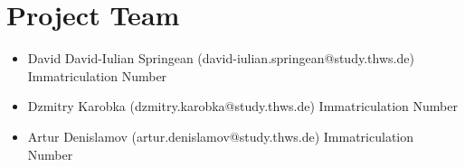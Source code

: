 \section{Project Team}

\begin{itemize}
    \item David David-Iulian Springean (david-iulian.springean@study.thws.de) Immatriculation Number
    \item Dzmitry Karobka (dzmitry.karobka@study.thws.de) Immatriculation Number
    \item Artur Denislamov (artur.denislamov@study.thws.de) Immatriculation Number
\end{itemize}